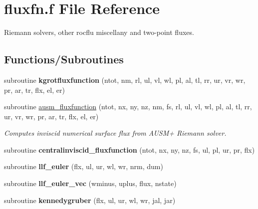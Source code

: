 \hypertarget{fluxfn_8f}{\section{fluxfn.\-f File Reference}
\label{fluxfn_8f}
}


Riemann solvers, other rocflu miscellany and two-\/point fluxes.  


\subsection*{Functions/\-Subroutines}
\begin{DoxyCompactItemize}
\item 
\hypertarget{fluxfn_8f_aa0303cef4d920383bd1c82425e0ca07d}{subroutine {\bfseries kgrotfluxfunction} (ntot, nm, rl, ul, vl, wl, pl, al, tl, rr, ur, vr, wr, pr, ar, tr, flx, el, er)}\label{fluxfn_8f_aa0303cef4d920383bd1c82425e0ca07d}

\item 
\hypertarget{group__isurf_ga2b8162e02f3f2266c59f717fa1363226}{subroutine \hyperlink{group__isurf_ga2b8162e02f3f2266c59f717fa1363226}{ausm\-\_\-fluxfunction} (ntot, nx, ny, nz, nm, fs, rl, ul, vl, wl, pl, al, tl, rr, ur, vr, wr, pr, ar, tr, flx, el, er)}\label{group__isurf_ga2b8162e02f3f2266c59f717fa1363226}

\begin{DoxyCompactList}\small\item\em Computes inviscid numerical surface flux from A\-U\-S\-M+ Riemann solver. \end{DoxyCompactList}\item 
\hypertarget{fluxfn_8f_a3a083fcb64cd04500931d07c3c271a3d}{subroutine {\bfseries centralinviscid\-\_\-fluxfunction} (ntot, nx, ny, nz, fs, ul, pl, ur, pr, flx)}\label{fluxfn_8f_a3a083fcb64cd04500931d07c3c271a3d}

\item 
\hypertarget{fluxfn_8f_acbc3512b880f3599497696d179efcaf4}{subroutine {\bfseries llf\-\_\-euler} (flx, ul, ur, wl, wr, nrm, dum)}\label{fluxfn_8f_acbc3512b880f3599497696d179efcaf4}

\item 
\hypertarget{fluxfn_8f_aa210cc6f937700f2161b8ef80941b1b7}{subroutine {\bfseries llf\-\_\-euler\-\_\-vec} (wminus, uplus, flux, nstate)}\label{fluxfn_8f_aa210cc6f937700f2161b8ef80941b1b7}

\item 
\hypertarget{fluxfn_8f_acdcfc163b5cd7fad3949be97707176d0}{subroutine {\bfseries kennedygruber} (flx, ul, ur, wl, wr, jal, jar)}\label{fluxfn_8f_acdcfc163b5cd7fad3949be97707176d0}


\end{DoxyCompactItemize}
